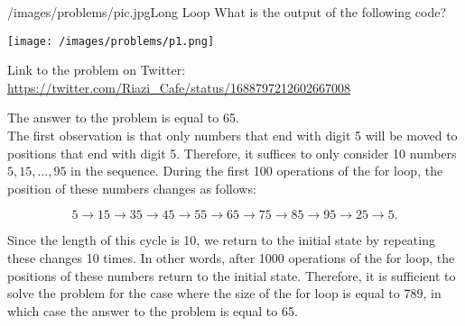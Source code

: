 \begin{problem}{/images/problems/pic.jpg}{Long Loop}
	What is the output of the following code?

\begin{center}
	\texttt{[image: /images/problems/p1.png]}
\end{center}

Link to the problem on Twitter:  \url{https://twitter.com/Riazi_Cafe/status/1688797212602667008}
\end{problem}
\begin{solution}
The answer to the problem is equal to 65.\\[0.2cm]

The first observation is that only numbers that end with digit 5 will be moved to positions that end with digit 5. Therefore, it suffices to only consider 10 numbers $5, 15, \ldots, 95$ in the sequence.
During the first 100 operations of the for loop, the position of these numbers changes as follows:

$$5 \rightarrow 15 \rightarrow 35 \rightarrow 45 \rightarrow 55 \rightarrow 65 \rightarrow 75 \rightarrow 85 \rightarrow 95 \rightarrow 25 \rightarrow 5.$$

Since the length of this cycle is 10, we return to the initial state by repeating these changes 10 times. In other words, after 1000 operations of the for loop, the positions of these numbers return to the initial state. Therefore, it is sufficient to solve the problem for the case where the size of the for loop is equal to 789, in which case the answer to the problem is equal to 65.




\end{solution}